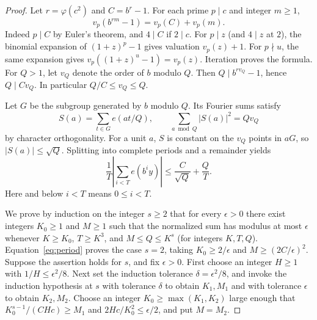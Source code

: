 \documentclass[11pt]{article}
\begin{document}
\begin{proof}
Let \(r=\varphi(c^2)\) and \(C=b^r-1\). For each prime \(p\mid c\) and integer \(m\ge1\),
\[
 v_p(b^{rm}-1)=v_p(C)+v_p(m).
\]
Indeed \(p\mid C\) by Euler's theorem, and \(4\mid C\) if \(2\mid c\). For \(p\mid z\) (and \(4\mid z\) at \(2\)), the binomial expansion of \((1+z)^p-1\) gives valuation \(v_p(z)+1\). For \(p\nmid u\), the same expansion gives \(v_p((1+z)^u-1)=v_p(z)\). Iteration proves the formula. For \(Q>1\), let \(v_Q\) denote the order of \(b\) modulo \(Q\). Then \(Q\mid b^{rv_Q}-1\), hence \(Q\mid C v_Q\). In particular \(Q/C\le v_Q\le Q\).

Let \(G\) be the subgroup generated by \(b\) modulo \(Q\). Its Fourier sums satisfy
\[
 S(a)=\sum_{t\in G}e(at/Q),\qquad \sum_{a\bmod Q}|S(a)|^2=Qv_Q
\]
by character orthogonality. For a unit \(a\), \(S\) is constant on the \(v_Q\) points in \(aG\), so \(|S(a)|\le\sqrt Q\). Splitting into complete periods and a remainder yields
\begin{equation}\label{eq:period}
 \frac1T\left|\sum_{i<T}e(b^iy)\right|\le \frac{C}{\sqrt Q}+\frac{Q}{T}.
\end{equation}
Here and below \(i<T\) means \(0\le i<T\).

We prove by induction on the integer \(s\ge2\) that for every \(\epsilon>0\) there exist integers \(K_0\ge1\) and \(M\ge1\) such that the normalized sum has modulus at most \(\epsilon\) whenever \(K\ge K_0\), \(T\ge K^3\), and \(M\le Q\le K^s\) (for integers \(K,T,Q\)). Equation~\eqref{eq:period} proves the case \(s=2\), taking \(K_0\ge 2/\epsilon\) and \(M\ge (2C/\epsilon)^2\). Suppose the assertion holds for \(s\), and fix \(\epsilon>0\). First choose an integer \(H\ge1\) with \(1/H\le\epsilon^2/8\). Next set the induction tolerance \(\delta=\epsilon^2/8\), and invoke the induction hypothesis at \(s\) with tolerance \(\delta\) to obtain \(K_1,M_1\) and with tolerance \(\epsilon\) to obtain \(K_2,M_2\). Choose an integer \(K_0\ge\max(K_1,K_2)\) large enough that \(K_0^{s-1}/(CHc)\ge M_1\) and \(2Hc/K_0^2\le\epsilon/2\), and put \(M=M_2\).


\end{proof}
\end{document}
